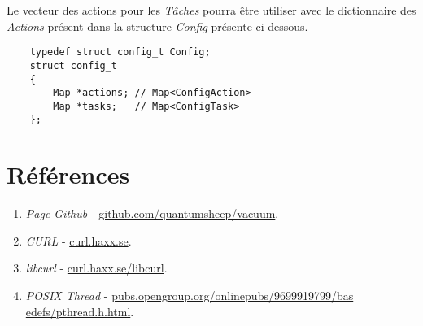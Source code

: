 \documentclass[conference]{IEEEtran}
\begin{document}
Le vecteur des actions pour les \textit{Tâches} pourra être utiliser avec le dictionnaire des \textit{Actions} présent dans la structure \textit{Config} présente ci-dessous.

\begin{lstlisting}
    typedef struct config_t Config;
    struct config_t
    {
        Map *actions; // Map<ConfigAction>
        Map *tasks;   // Map<ConfigTask>
    };
\end{lstlisting}

\section{Références}

\begin{enumerate}
    \item \textit{Page Github} - \href{https://github.com/quantumsheep/vacuum}{github.com/quantumsheep/vacuum}.
    \item \textit{CURL} - \href{https://curl.haxx.se/}{curl.haxx.se}.
    \item \textit{libcurl} - \href{https://curl.haxx.se/libcurl/}{curl.haxx.se/libcurl}.
    \item \textit{POSIX Thread} - \href{https://pubs.opengroup.org/onlinepubs/9699919799/basedefs/\\pthread.h.html}{pubs.opengroup.org/onlinepubs/9699919799/bas\\edefs/pthread.h.html}.
\end{enumerate}
\end{document}
